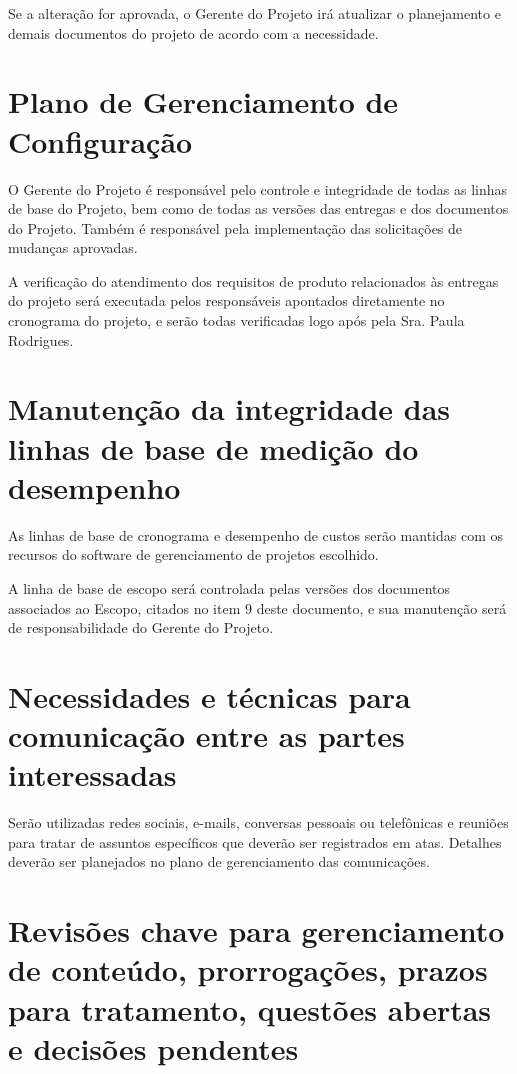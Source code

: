 \documentclass[12pt]{charter}
\begin{document}
\noindent Se a alteração for aprovada, o Gerente do Projeto irá atualizar o planejamento e demais documentos do projeto de acordo com a necessidade.

\section*{Plano de Gerenciamento de Configuração}
\label{sec:configuração}

O Gerente do Projeto é responsável pelo controle e integridade de todas as linhas de base do Projeto, bem como de todas as versões das entregas e dos documentos do Projeto. Também é responsável pela implementação das solicitações de mudanças aprovadas. \newline

\noindent A verificação do atendimento dos requisitos de produto relacionados às entregas do projeto será executada pelos responsáveis apontados diretamente no cronograma do projeto, e serão todas verificadas logo após pela Sra. Paula Rodrigues.

\section*{Manutenção da integridade das linhas de base de medição do desempenho}
\label{sec:manutenção}

As linhas de base de cronograma e desempenho de custos serão mantidas com os recursos do software de gerenciamento de projetos escolhido. \newline

\noindent A linha de base de escopo será controlada pelas versões dos documentos associados ao Escopo, citados no item 9 deste documento, e sua manutenção será de responsabilidade do Gerente do Projeto.

\section*{Necessidades e técnicas para comunicação entre as partes interessadas}
\label{sec:necessidades}

Serão utilizadas redes sociais, e-mails, conversas pessoais ou telefônicas e reuniões para tratar de assuntos específicos que deverão ser registrados em atas. Detalhes deverão ser planejados no plano de gerenciamento das comunicações.

\section*{Revisões chave para gerenciamento de conteúdo, prorrogações, prazos para tratamento, questões abertas e decisões pendentes}
\label{sec:revisoes}
\end{document}
